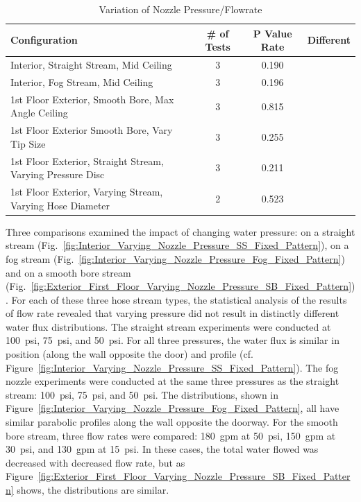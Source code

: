 \documentclass[12pt,oneside]{book}
\begin{document}
\begin{table}[!ht]
\centering
\footnotesize
\caption{Variation of Nozzle Pressure/Flowrate}
\label{tab:add_pressure}
\begin{tabular}{lccc}
\toprule[1.5pt]
Configuration & \# of Tests & P Value Rate & Different \\ 
\midrule
 Interior, Straight Stream, Mid Ceiling                      & 3   & 0.190   &            \\
 Interior, Fog Stream, Mid Ceiling                           & 3   & 0.196   &            \\
 1st Floor Exterior, Smooth Bore, Max Angle Ceiling          & 3   & 0.815   &            \\
 1st Floor Exterior Smooth Bore, Vary Tip Size               & 3   & 0.255   &            \\
 1st Floor Exterior, Straight Stream, Varying Pressure Disc  & 3   & 0.211   &            \\
 1st Floor Exterior, Varying Stream, Varying Hose Diameter   & 2   & 0.523   &            \\
\bottomrule[1.25pt]
\end{tabular}
\end{table}

Three comparisons examined the impact of changing water pressure: on a straight stream (Fig.~\ref{fig:Interior_Varying_Nozzle_Pressure_SS_Fixed_Pattern}), on a fog stream (Fig.~\ref{fig:Interior_Varying_Nozzle_Pressure_Fog_Fixed_Pattern}) and on a smooth bore stream (Fig.~\ref{fig:Exterior_First_Floor_Varying_Nozzle_Pressure_SB_Fixed_Pattern}). For each of these three hose stream types, the statistical analysis of the results of flow rate revealed that varying pressure did not result in distinctly different water flux distributions. The straight stream experiments were conducted at 100~psi, 75~psi, and 50~psi. For all three pressures, the water flux is similar in position (along the wall opposite the door) and profile (cf. Figure~\ref{fig:Interior_Varying_Nozzle_Pressure_SS_Fixed_Pattern}). The fog nozzle experiments were conducted at the same three pressures as the straight stream: 100~psi, 75~psi, and 50~psi. The distributions, shown in Figure~\ref{fig:Interior_Varying_Nozzle_Pressure_Fog_Fixed_Pattern}, all have similar parabolic profiles along the wall opposite the doorway. For the smooth bore stream, three flow rates were compared: 180~gpm at 50~psi, 150~gpm at 30~psi, and 130~gpm at 15~psi. In these cases, the total water flowed was decreased with decreased flow rate, but as Figure~\ref{fig:Exterior_First_Floor_Varying_Nozzle_Pressure_SB_Fixed_Pattern} shows, the distributions are similar. 
\end{document}
